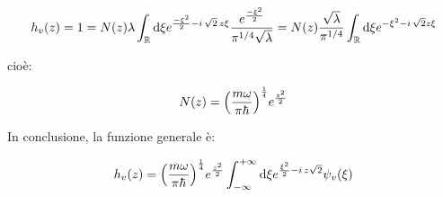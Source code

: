 \begin{align*}
	h_v\qty(z) = 1 = N\qty(z) \lambda \int_{\mathbb{R}} \dd \xi e^{\frac{- \xi^2}{2} - i \, \sqrt{2} \, z \xi} \frac{e^{\frac{- \xi^2}{2}}}{\pi^{1/4} \sqrt{\lambda}} = N\qty(z) \frac{\sqrt{\lambda}}{\pi^{1/4}} \int_{\mathbb{R}} \dd \xi e^{- \xi^2 - i \, \sqrt{2} z \xi}
\end{align*}
 
	cioè:
	
\begin{align*}
	N\qty(z) = \qty(\frac{m \omega}{\pi \hbar})^{\frac{1}{4}} e^{\frac{z^2}{2}}
\end{align*}
	
	In conclusione, la funzione generale è:
	
\begin{align*}
	h_v\qty(z) = \qty(\frac{m \omega}{\pi \hbar})^{\frac{1}{4}} e^{\frac{z^2}{2}} \int_{-\infty}^{+\infty} \dd \xi e^{\frac{\xi^2}{2} - i \, z \sqrt{2}} \psi_v\qty(\xi)
\end{align*}










	
	